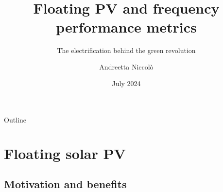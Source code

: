 \documentclass[aspectratio=169, 12pt]{beamer}
\title{Floating PV and frequency performance metrics }
\subtitle{The electrification behind the green revolution}
\author{Andreetta Niccolò}
\date{July 2024}
\begin{document}
  \maketitle

  \begin{frame}[fragile]{Outline}
    \tableofcontents
  \end{frame}

               

\section{Floating solar PV}
\subsection{Motivation and benefits}
\end{document}
